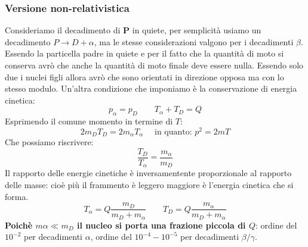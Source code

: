 \subsubsection{Versione non-relativistica}
Consideriamo il decadimento di \textbf{P} in quiete, per semplicità usiamo un decadimento $P\to D+\alpha$, ma le stesse considerazioni valgono per i decadimenti $\beta$. Essendo la particella padre in quiete e per il fatto che la quantità di moto si conserva avrò che anche la quantità di moto finale deve essere nulla. Essendo solo due i nuclei figli allora avrò che sono orientati in direzione opposa ma con lo stesso modulo. Un'altra condizione che imponiamo è la conservazione di energia cinetica:
\begin{equation*}
    p_\alpha=p_D \qquad T_\alpha+T_D=Q
\end{equation*}
Esprimendo il comune momento in termine di $T$:
\begin{equation*}
    2m_DT_D=2m_\alpha T_\alpha \quad \text{ in quanto: } p^2=2mT
\end{equation*}
Che possiamo riscrivere:
\begin{equation*}
    \frac{T_D}{T_\alpha}=\frac{m_\alpha}{m_D}
\end{equation*}
Il rapporto delle energie cinetiche è inversamentente proporzionale al rapporto delle masse: cioè più il frammento è leggero maggiore è l'energia cinetica che si forma.
\begin{equation*}
    T_\alpha=Q\frac{m_D}{m_D+m_\alpha} \qquad T_D=Q\frac{m_\alpha}{m_D+m_\alpha}
\end{equation*}
\textbf{Poichè $m\alpha\ll m_D$ il nucleo si porta una frazione piccola di $Q$}: ordine del $10^{-2}$ per decadimenti $\alpha$, ordine del $10^{-4}-10^{-5}$ per decadimenti $\beta/\gamma$.
